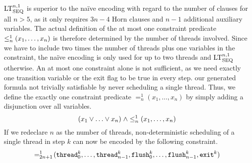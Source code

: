 $\text{LT}^{n, 1}_{\text{SEQ}}$ is superior to the na\"ive encoding with regard to the number of clauses for all $n > 5$, as it only requires $3n - 4$ Horn clauses and $n - 1$ additional auxiliary variables.
The actual definition of the at most one constraint predicate $\leq^1_n(x_1, \ldots, x_n)$ is therefore determined by the number of threads involved.
Since we have to include two times the number of threads plus one variables in the constraint, the na\"ive encoding is only used for up to two threads and $\text{LT}^{n, 1}_{\text{SEQ}}$ otherwise.
An at most one constraint alone is not sufficient, as we need exactly one transition variable or the exit flag to be true in every step.
 our generated formula  not  trivially satisfiable by never scheduling a single thread.
Thus, we define the exactly one constraint predicate $=^1_n\!(x_1, \ldots, x_n)$ by simply adding a disjunction over all variables.%
\[
  (x_1 \lor \ldots \lor x_n) \; \land \leq^1_n(x_1, \ldots, x_n)
\]
If we redeclare $n$ as the number of threads, non-deterministic scheduling of a single thread in step $k$ can now be encoded by the following constraint.
\[
  =^1_{2n + 1}\!(\texttt{thread}^k_0, \ldots, \texttt{thread}^k_{n-1}, \texttt{flush}^k_0, \ldots, \texttt{flush}^k_{n-1}, \texttt{exit}^k)
\]

